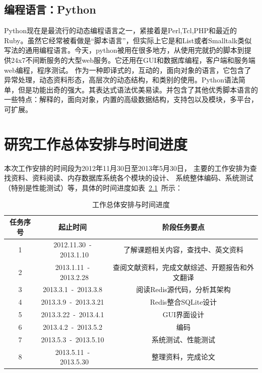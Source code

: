 \documentclass[proposal]{zjutreport}
\begin{document}
\section{编程语言：Python}
Python\cite{ref:11}现在是最流行的动态编程语言之一，紧接着是Perl,Tcl,PHP和最近的Ruby。虽然它经常被看做是“脚本语言”，但实际上它是和List或者Smalltalk类似写法的通用编程语言。今天，python被用在很多地方，从使用完就扔的脚本到提供24x7不间断服务的大型web服务。它还用在GUI和数据库编程，客户端和服务端web编程，程序测试。
作为一种即译式的，互动的，面向对象的语言，它包含了异常处理，动态资料形态，高层次的动态结构，和类别的使用。Python语法简单，但是功能出奇的强大。其表达式语法优美易读。并包含了其他优秀脚本语言的一些特点：解释的，面向对象，内置的高级数据结构，支持包以及模块，多平台，可扩展。

\newpage

\chapter{研究工作总体安排与时间进度}
本次工作安排的时间段为2012年11月30日至2013年5月30日，
主要的工作安排为查找资料、资料阅读、内存数据库系统各个模块的设计、
系统整体编码、系统测试（特别是性能测试）等，具体的时间进度如表~\ref{tab:table1}~所示：

\begin{table}[htbp]
\caption{工作总体安排与时间进度}\label{tab:table1}
\vspace{0.5em}
\begin{center}
{\wuhao
\begin{tabular}{|c|c|c|}
\hline
任务序号 & 起止时间 & 阶段任务要点\\ \hline
1 & 2012.11.30~-~2013.1.10 & 了解课题相关内容，查找中、英文资料\\ \hline
2 & 2013.1.11~-~2013.2.28 & 查阅文献资料，完成文献综述、开题报告和外文翻译\\ \hline
3 & 2013.3.1~-~2013.3.8 & 阅读Redis源代码，分析其架构\\ \hline
4 & 2013.3.9~-~2013.3.21 & Redis整合SQLite设计\\ \hline
5 & 2013.3.22~-~2013.4.1 & GUI界面设计\\ \hline
6 & 2013.4.2~-~2013.5.2 & 编码\\ \hline
7 & 2013.5.3~-~2013.5.10 & 系统测试、性能测试\\ \hline
8 & 2013.5.11~-~2013.5.30 & 整理资料，完成论文\\ \hline
\end{tabular}}
\end{center}
\vspace{\baselineskip}
\end{table}

\backmatter
\endgroup %

\clearpage %

\nocite{*}                                   %

\end{document}
